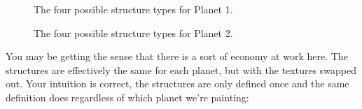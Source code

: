 \begin{figure}[H]
  {
    \setlength{\tabcolsep}{3.0pt}
    \setlength\cmidrulewidth{\heavyrulewidth} %
    \begin{adjustbox}{width=15cm,center}
      \begin{subfigure}{0.3\textwidth}
        
      \end{subfigure}
      \begin{subfigure}{0.3\textwidth}
        
      \end{subfigure}
      \begin{subfigure}{0.3\textwidth}
        
      \end{subfigure}
      \begin{subfigure}{0.3\textwidth}
        
      \end{subfigure}
    \end{adjustbox}
  }\caption[]{The four possible structure types for Planet 1.}
\end{figure}

\begin{figure}[H]
  {
    \setlength{\tabcolsep}{3.0pt}
    \setlength\cmidrulewidth{\heavyrulewidth} %
    \begin{adjustbox}{width=15cm,center}
      \begin{subfigure}{0.3\textwidth}
        
      \end{subfigure}
      \begin{subfigure}{0.3\textwidth}
        
      \end{subfigure}
      \begin{subfigure}{0.3\textwidth}
        
      \end{subfigure}
      \begin{subfigure}{0.3\textwidth}
        
      \end{subfigure}
    \end{adjustbox}
  }\caption[]{The four possible structure types for Planet 2.}
\end{figure}

You may be getting the sense that there is a sort of economy at work here. The structures are effectively
the same for each planet, but with the textures swapped out. Your intuition is correct, the structures
are only defined once and the same definition does regardless of which planet we're painting:

